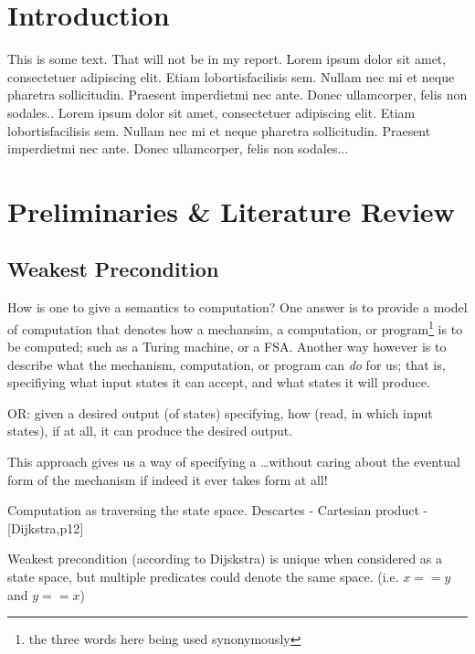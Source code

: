 \documentclass[oneside,12pt]{article}
\begin{document}
\pagebreak
  
\tableofcontents

\pagebreak

\raggedbottom

\section{Introduction}


This is some text. That will not be in my report. Lorem  ipsum  dolor  sit  amet,  consectetuer  adipiscing  
elit.   Etiam  lobortisfacilisis sem.  Nullam nec mi et 
neque pharetra sollicitudin.  Praesent imperdietmi nec ante. 
Donec ullamcorper, felis non sodales.. Lorem  ipsum  dolor  sit  amet,  consectetuer  adipiscing  
elit.   Etiam  lobortisfacilisis sem.  Nullam nec mi et 
neque pharetra sollicitudin.  Praesent imperdietmi nec ante. 
Donec ullamcorper, felis non sodales...

\section{Preliminaries \& Literature Review}

\subsection{Weakest Precondition}

How is one to give a semantics to computation? One answer is to provide a model of computation that denotes how a mechansim, a computation, or program\footnote{ the three words here being used synonymously} is to be computed; such as a Turing machine, or a FSA. Another way however is to describe what the mechanism, computation, or program can \emph{do} for us; that is, specifiying what input states it can accept, and what states it will produce.


OR: given a desired output (of states) specifying, how (read, in which input states), if at all, it can produce the desired output.

This approach gives us a way of specifying a \ldots without caring about the eventual form of the mechanism if indeed it ever takes form at all!

Computation as traversing the state space. Descartes - Cartesian product - [Dijkstra,p12]


Weakest precondition (according to Dijskstra) is unique when considered as a state space, but multiple predicates could denote the same space. (i.e. $x == y$ and $y == x$)
\end{document}

